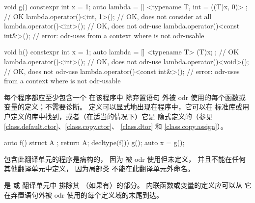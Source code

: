 \pnum
\begin{example}
\begin{codeblock}
void g() {
  constexpr int x = 1;
  auto lambda = [] <typename T, int = ((T)x, 0)> {};    // OK
  lambda.operator()<int, 1>();          // OK, does not consider  at all
  lambda.operator()<int>();             // OK, does not odr-use 
  lambda.operator()<const int&>();      // error: odr-uses  from a context where  is not odr-usable
}

void h() {
  constexpr int x = 1;
  auto lambda = [] <typename T> { (T)x; };      // OK
  lambda.operator()<int>();             // OK, does not odr-use 
  lambda.operator()<void>();            // OK, does not odr-use 
  lambda.operator()<const int&>();      // error: odr-uses  from a context where  is not odr-usable
}
\end{codeblock}
\end{example}

\pnum
每个程序都应至少包含一个
在该程序中
除弃置语句 外被 odr 使用的每个函数或变量的定义；不需要诊断。
定义可以显式地出现在程序中，它可以在
标准库或用户定义的库中找到，或者（在适当的情况下）它是
隐式定义的（参见 \ref{class.default.ctor}、\ref{class.copy.ctor}、
\ref{class.dtor} 和 \ref{class.copy.assign}）。
\begin{example}
\begin{codeblock}
auto f() {
  struct A {};
  return A{};
}
decltype(f()) g();
auto x = g();
\end{codeblock}
包含此翻译单元的程序是病构的，
因为  被 odr 使用但未定义，
并且不能在任何其他翻译单元中定义，
因为局部类  不能在此翻译单元外命名。
\end{example}

\pnum
{} 是
 或
翻译单元中
排除其 （如果有）的部分。
内联函数或变量的定义应可以从
它在弃置语句外被 odr 使用的每个定义域的末尾到达。

